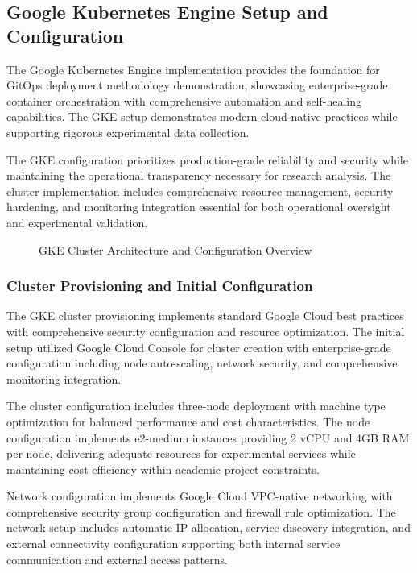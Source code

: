 \subsection{Google Kubernetes Engine Setup and Configuration}

The Google Kubernetes Engine implementation provides the foundation for GitOps deployment methodology demonstration, showcasing enterprise-grade container orchestration with comprehensive automation and self-healing capabilities. The GKE setup demonstrates modern cloud-native practices while supporting rigorous experimental data collection.

The GKE configuration prioritizes production-grade reliability and security while maintaining the operational transparency necessary for research analysis. The cluster implementation includes comprehensive resource management, security hardening, and monitoring integration essential for both operational oversight and experimental validation.

\begin{figure}[H]
\centering
\caption{GKE Cluster Architecture and Configuration Overview}
\label{fig:gke-cluster-architecture}
\end{figure}

\subsubsection{Cluster Provisioning and Initial Configuration}

The GKE cluster provisioning implements standard Google Cloud best practices with comprehensive security configuration and resource optimization. The initial setup utilized Google Cloud Console for cluster creation with enterprise-grade configuration including node auto-scaling, network security, and comprehensive monitoring integration.

The cluster configuration includes three-node deployment with machine type optimization for balanced performance and cost characteristics. The node configuration implements e2-medium instances providing 2 vCPU and 4GB RAM per node, delivering adequate resources for experimental services while maintaining cost efficiency within academic project constraints.

Network configuration implements Google Cloud VPC-native networking with comprehensive security group configuration and firewall rule optimization. The network setup includes automatic IP allocation, service discovery integration, and external connectivity configuration supporting both internal service communication and external access patterns.

